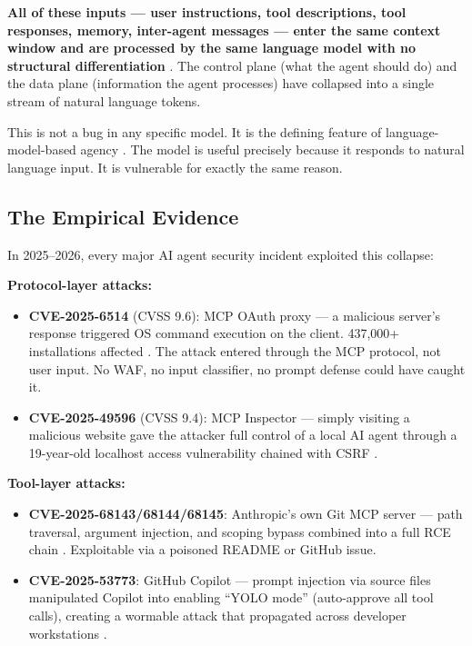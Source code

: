 \documentclass[11pt,letterpaper]{article}
\begin{document}
\textbf{All of these inputs --- user instructions, tool descriptions, tool responses, memory, inter-agent messages --- enter the same context window and are processed by the same language model with no structural differentiation} \cite{kim2026,chhabra2025,survey2026}. The control plane (what the agent should do) and the data plane (information the agent processes) have collapsed into a single stream of natural language tokens.

This is not a bug in any specific model. It is the defining feature of language-model-based agency \cite{promptinjsurvey}. The model is useful precisely because it responds to natural language input. It is vulnerable for exactly the same reason.


\subsection{The Empirical Evidence}

In 2025--2026, every major AI agent security incident exploited this collapse:

\textbf{Protocol-layer attacks:}

\begin{itemize}
\item \textbf{CVE-2025-6514} (CVSS 9.6): MCP OAuth proxy --- a malicious server's response triggered OS command execution on the client. 437,000+ installations affected \cite{cve6514}. The attack entered through the MCP protocol, not user input. No WAF, no input classifier, no prompt defense could have caught it.
\item \textbf{CVE-2025-49596} (CVSS 9.4): MCP Inspector --- simply visiting a malicious website gave the attacker full control of a local AI agent through a 19-year-old localhost access vulnerability chained with CSRF \cite{cve49596}.
\end{itemize}

\textbf{Tool-layer attacks:}

\begin{itemize}
\item \textbf{CVE-2025-68143/68144/68145}: Anthropic's own Git MCP server --- path traversal, argument injection, and scoping bypass combined into a full RCE chain \cite{cvegit}. Exploitable via a poisoned README or GitHub issue.
\item \textbf{CVE-2025-53773}: GitHub Copilot --- prompt injection via source files manipulated Copilot into enabling ``YOLO mode'' (auto-approve all tool calls), creating a wormable attack that propagated across developer workstations \cite{cve53773}.
\end{itemize}
\end{document}
